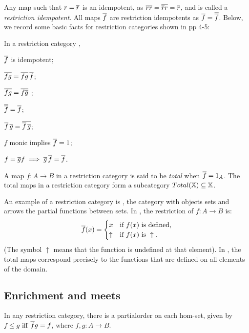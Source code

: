   Any map such that $r=\overline{r}$ is an idempotent, as $\overline{r}\overline{r} = \overline{\overline{r} r} = \overline{r}$,
  and is called a \emph{restriction idempotent}. All maps $\overline{f}$ are restriction idempotents as
  $\overline{f}=\overline{\overline{f}}$. Below, we record some basic facts for restriction categories
  shown in \cite{cockett2002:restcategories1} pp 4-5:
  \begin{lemma}\label{lem:identities_involving_restriction}
    In a restriction category \X,
    \bproofenum
      \item{}$\overline{f}$ is idempotent;
      \item{} $\overline{f g} = \overline{f g} \, \overline{f}$;\label{lemsub:restriction_identities_two}
      \item{} $\overline{f g} = \overline{f \overline{g}}$ ;
      \item{} $\overline{\overline{f}} = \overline{f}$;
      \item{} $\overline{f}\,\overline{g} = \overline{\overline{f}\,\overline{g}}$;
      \item{} $f$ monic implies $\overline{f} = 1$;
      \item{} $f = \overline{g} f \implies \overline{g}\,\overline{f} = \overline{f}$.
    \eproofenum
  \end{lemma}

  A map $f:A\to B$ in a restriction category is said to be \emph{total} when
  $\overline{f} = 1_A$. The total maps in a restriction category form a subcategory
  $Total(\mathbb{X}) \subseteq \mathbb{X}$.

  An example of a restriction category is \Par, the category with objects sets and arrows the 
  partial functions between sets. In \Par, the restriction of $f:A\to B$ is:
  \[
    \overline{f}(x) =
    \begin{cases}
      x&\text{if $f(x)$ is defined,}\\
      \uparrow&\text{if }f(x)\text{ is }\uparrow.
    \end{cases}
  \]
  (The symbol $\uparrow$ means that the function is undefined at that element). In \Par, the
  total maps correspond precisely to the functions that are defined on all elements of the domain.


  \subsection{Enrichment and meets} %
    \label{sub:enrichment_and_meets}


    In any restriction category, there is a partialorder on each hom-set, given by $f \le g$ iff
    $\overline{f} g = f$, where $f,g:A\to B$.

